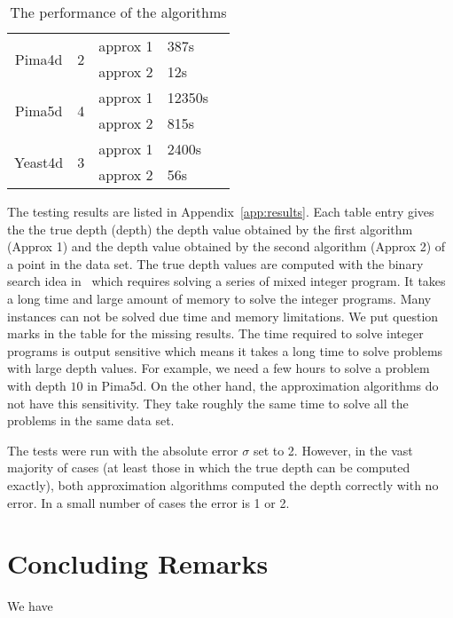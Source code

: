 \documentclass{patmorin}
\begin{document}
\begin{table}[!htb]
\begin{tabular}[center]{|c|c|l|l|l|}
    \hline
    \multirow{2}{*}{Pima4d} & \multirow{2}{*}{2} & approx 1 & 387s & \\
    & & approx 2 & 12s & \\
    \hline
    \multirow{2}{*}{Pima5d} & \multirow{2}{*}{4} & approx 1 & 12350s & \\
    & & approx 2 & 815s & \\
    \hline
    \multirow{2}{*}{Yeast4d} & \multirow{2}{*}{3} & approx 1 & 2400s & \\
    & & approx 2 & 56s & \\
    \hline
  \end{tabular}
  \caption{The performance of the algorithms}
  \label{tab:performance}
\end{table}

The testing results are listed in Appendix~\ref{app:results}.  Each table entry gives the the true depth (depth) the depth value obtained by the first algorithm (Approx 1) and the depth value obtained by the second algorithm (Approx 2) of a point in the data set. The true depth values are computed with the binary search idea in~\cite{Chen07} which requires solving a series of mixed integer program. It takes a long time and large amount of memory to solve the integer programs. Many instances can not be solved due time and memory limitations. We put question marks in the table for the missing results. The time required to solve integer programs is output sensitive which means it takes a long time to solve problems with large depth values. For example, we need a few hours to solve a problem with depth $10$ in Pima5d. On the other hand, the approximation algorithms do not have this sensitivity. They take roughly the same time to solve all the problems in the same data set.

The tests were run with the absolute error $\sigma$ set to 2.  However,
in the vast majority of cases (at least those in which the true depth
can be computed exactly), both approximation algorithms computed the
depth correctly with no error.  In a small number of cases the error is 1 or 2.


\section{Concluding Remarks}
\label{sec:cld}

We have

\end{document}
